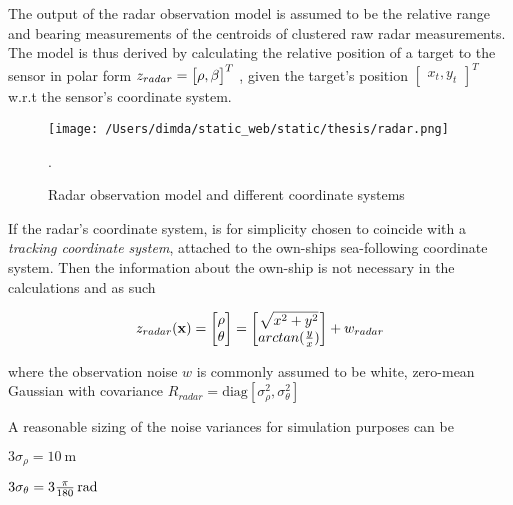 The output of the radar observation model is assumed to be the relative range and bearing measurements of the centroids of clustered raw radar measurements. The model is thus derived by calculating the relative position of a target to the sensor in polar form $z_{radar} = \begin{bmatrix}
{\rho},
{\beta}
\end{bmatrix}^{T}$ , given the target's position $\begin{bmatrix}x_t, y_t\end{bmatrix}^{T}$ w.r.t the sensor's coordinate system.


\begin{figure}[H]
	\centering
	\texttt{[image: /Users/dimda/static\_web/static/thesis/radar.png]}
	\caption{Radar observation model and different coordinate systems}.
	\label{fig:radar_observation_model}
\end{figure}


If the radar's coordinate system, is for simplicity  chosen to coincide with a \emph{tracking coordinate system},  attached to the own-ships sea-following coordinate system. Then the information about the own-ship is not necessary in the calculations and as such

\begin{equation}
z_{radar}(\mathbf{x}) = \begin{bmatrix}
\rho \\
\theta
\end{bmatrix} = \begin{bmatrix}
\sqrt{x^2 + y^2} \\
arctan(\frac{y}{x})
\end{bmatrix} + {w}_{radar}
\end{equation}


where the observation noise $w$ is commonly assumed to be white, zero-mean Gaussian with covariance $R_{radar} = \text{diag}\left[\sigma^2_{\rho}, \sigma^2_{\theta}\right] $



A reasonable sizing of the noise variances for simulation purposes can be
\begin{description}
	\item $3\sigma_\rho = \SI{10}{\meter}$
	\item $3\sigma_\theta = \SI[parse-numbers=false]{3\frac{\pi}{180}}{\radian}  $
\end{description}

